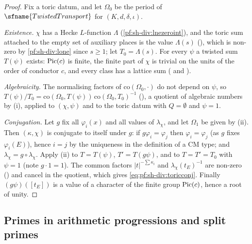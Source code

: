 \begin{proof}
Fix a toric datum, and let $\Omega_0$ be the period of $\sfname{TwistedTransport}$ for $(K,d,\delta,\iota)$.

\emph{Existence.} $\chi$ has a Hecke $L$-function $\Lambda$ (\cref{pf:sh-div:lnezeroint}), and the toric sum attached to
the empty set of auxiliary places is the value $\Lambda(s)$ (), which is non-zero by
\cref{pf:sh-div:lone} since $s\ge1$; let $T_0=\Lambda(s)$. For every
$\psi$ a twisted sum $T(\psi)$ exists: $\operatorname{Pic}(c)$ is finite, the finite part of $\chi$ is trivial on the units of the order
of conductor $c$, and every class has a lattice sum
( and ).

\emph{Algebraicity.} The normalising factors of $\mathrm{co}(\Omega_0,\cdot)$ do not depend on $\psi$, so
$T(\psi)/T_0=\mathrm{co}(\Omega_0,T(\psi))\,\mathrm{co}(\Omega_0,T_0)^{-1}$ (),
a quotient of algebraic numbers by (i), applied to $(\chi,\psi)$ and to the toric datum with $Q=\emptyset$ and $\psi=1$.

\emph{Conjugation.} Let $g$ fix all $\varphi_i(x)$ and all values of $\lambda_\chi$, and let $\Omega_1$ be given by (ii). Then
$(\kappa,\chi)$ is conjugate to itself under $g$: if $g\varphi_i=\varphi_j$ then $\varphi_i=\varphi_j$ (as $g$ fixes $\varphi_i(E)$),
hence $i=j$ by the uniqueness in the definition of a CM type; and $\lambda_\chi=g\circ\lambda_\chi$. Apply (ii) to $T=T(\psi)$,
$T'=T(g\psi)$, and to $T=T'=T_0$ with $\psi=1$ (note $g\cdot1=1$). The common factors $|t|^{-\sum\kappa_i}$ and $\lambda_\chi(t_E)^{-1}$
are non-zero () and cancel in the quotient, which
gives \eqref{eq:pf:sh-div:toricconj}. Finally $(g\psi)([t_E])$ is a value of a character of the finite group $\operatorname{Pic}(c)$, hence a
root of unity.
\end{proof}

\subsection{Primes in arithmetic progressions and split primes}\label{sec:pf:sh-div:primes}

